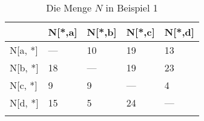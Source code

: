 \begin{longtable}[c]{|l|l|l|l|l|}
\hline
            & N{[}*,a{]} & N{[}*,b{]} & N{[}*,c{]} & N{[}*,d{]} \\ \hline
\endfirsthead
%
\endhead
%
N{[}a, *{]} & ---        & 10         & 19         & 13         \\ \hline
N{[}b, *{]} & 18         & ---        & 19         & 23         \\ \hline
N{[}c, *{]} & 9          & 9          & ---        & 4          \\ \hline
N{[}d, *{]} & 15         & 5          & 24         & ---        \\ \hline
\caption{Die Menge $N$ in Beispiel 1}
\label{Beispie1_N}\\
\end{longtable}